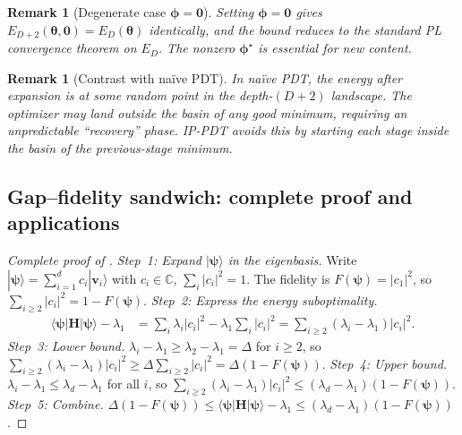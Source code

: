 \documentclass[11pt]{article}
\newcommand{\bbC}{\mathbb{C}}
\theoremstyle{plain}
\theoremstyle{plain}
\newtheorem{remark}[theorem]{Remark}
\begin{document}
\begin{remark}[Degenerate case $\bm\phi=\bm 0$]
\label{rem:degenerate_basin_app}
  Setting $\bm\phi=\bm 0$ gives
  $E_{D+2}(\bm\theta,\bm 0)=E_D(\bm\theta)$ identically, and the
  bound reduces to the standard PL convergence theorem on $E_D$.  The
  nonzero $\bm\phi^\star$ is essential for new content.
\end{remark}
\begin{remark}[Contrast with na\"ive PDT]
\label{rem:naive_contrast_app}
  In na\"ive PDT, the energy after expansion is at some random point
  in the depth-$(D{+}2)$ landscape.  The optimizer may land outside
  the basin of any good minimum, requiring an unpredictable ``recovery''
  phase.  IP-PDT avoids this by starting each stage inside the basin
  of the previous-stage minimum.
\end{remark}
\subsection{Gap--fidelity sandwich: complete proof and applications}
\label{app:gap_fidelity_extended}
\begin{proof}[Complete proof of ]
\emph{Step~1: Expand $|\boldsymbol{\psi}\rangle$ in the eigenbasis.}
Write $|\boldsymbol{\psi}\rangle=\sum_{i=1}^d c_i|\mathbf{v}_i\rangle$ with $c_i\in\bbC$,
$\sum_i|c_i|^2=1$.  The fidelity is $F(\boldsymbol{\psi})=|c_1|^2$, so
$\sum_{i\ge 2}|c_i|^2=1-F(\boldsymbol{\psi})$.
\emph{Step~2: Express the energy suboptimality.}
\begin{align*}
  \langle\boldsymbol{\psi}|\mathbf{H}|\boldsymbol{\psi}\rangle-\lambda_1
  &=\sum_i\lambda_i|c_i|^2-\lambda_1\sum_i|c_i|^2
  =\sum_{i\ge 2}(\lambda_i-\lambda_1)|c_i|^2.
\end{align*}
\emph{Step~3: Lower bound.}
$\lambda_i-\lambda_1\ge\lambda_2-\lambda_1=\Delta$ for $i\ge 2$, so
$\sum_{i\ge 2}(\lambda_i-\lambda_1)|c_i|^2
\ge\Delta\sum_{i\ge 2}|c_i|^2=\Delta(1-F(\boldsymbol{\psi}))$.
\emph{Step~4: Upper bound.}
$\lambda_i-\lambda_1\le\lambda_d-\lambda_1$ for all $i$, so
$\sum_{i\ge 2}(\lambda_i-\lambda_1)|c_i|^2
\le(\lambda_d-\lambda_1)(1-F(\boldsymbol{\psi}))$.
\emph{Step~5: Combine.}
$\Delta(1-F(\boldsymbol{\psi}))
\le\langle\boldsymbol{\psi}|\mathbf{H}|\boldsymbol{\psi}\rangle-\lambda_1
\le(\lambda_d-\lambda_1)(1-F(\boldsymbol{\psi}))$.
\end{proof}
\end{document}
